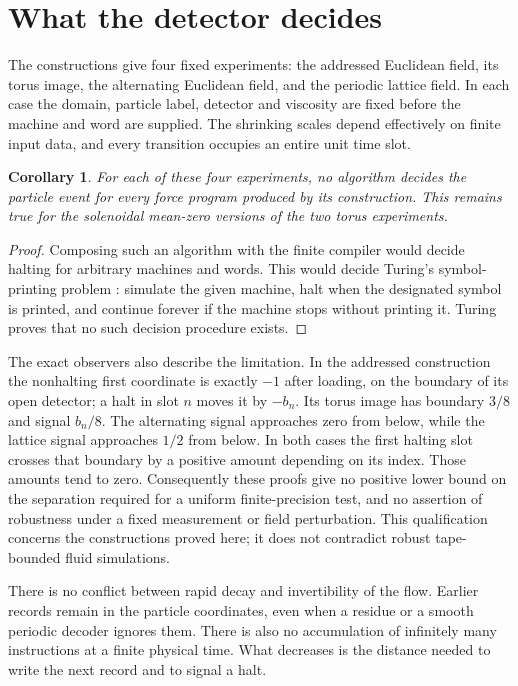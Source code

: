 \documentclass[11pt]{article}
\newtheorem{corollary}[theorem]{Corollary}
\theoremstyle{remark}
\begin{document}




\section{What the detector decides}\label{sec:consequences}

The constructions give four fixed experiments: the addressed Euclidean
field, its torus image, the alternating Euclidean field, and the periodic
lattice field. In each case the domain, particle label, detector and
viscosity are fixed before the machine and word are supplied.
The shrinking scales depend effectively on finite input data, and every
transition occupies an entire unit time slot.

\begin{corollary}\label{cor:undecidable}
For each of these four experiments, no algorithm decides the particle
event for every force program produced by its construction. This remains
true for the solenoidal mean-zero versions of the two torus experiments.
\end{corollary}
\begin{proof}
Composing such an algorithm with the finite compiler would decide
halting for arbitrary machines and words. This would decide Turing's
symbol-printing problem \cite[Section~8]{Turing}: simulate the given
machine, halt when the designated symbol is printed, and continue forever
if the machine stops without printing it. Turing proves that no such
decision procedure exists.
\end{proof}

The exact observers also describe the limitation. In the addressed
construction the nonhalting first coordinate is exactly $-1$ after
loading, on the boundary of its open detector; a halt in slot $n$ moves
it by $-b_n$. Its torus image has boundary $3/8$ and signal $b_n/8$.
The alternating signal approaches zero from below, while the lattice
signal approaches $1/2$ from below. In both cases the first halting slot
crosses that boundary by a positive amount depending on its index.
Those amounts tend to zero. Consequently these proofs give no positive
lower bound on the separation required for a uniform finite-precision
test, and no assertion of robustness under a fixed measurement or field
perturbation. This qualification concerns the constructions proved here;
it does not contradict robust tape-bounded fluid simulations.

There is no conflict between rapid decay and invertibility of the flow.
Earlier records remain in the particle coordinates, even when a residue
or a smooth periodic decoder ignores them. There is also no accumulation
of infinitely many instructions at a finite physical time. What decreases
is the distance needed to write the next record and to signal a halt.


\end{document}
